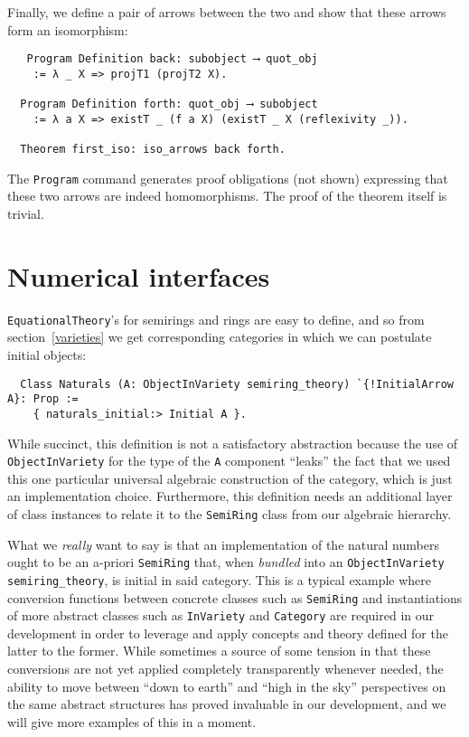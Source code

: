 \documentclass[a4paper,10pt,runningheads]{llncs}
\begin{document}
Finally, we define a pair of arrows between the two and show that these arrows form an isomorphism:
\begin{lstlisting}
   Program Definition back: subobject ⟶ quot_obj
    := λ _ X => projT1 (projT2 X).

  Program Definition forth: quot_obj ⟶ subobject
    := λ a X => existT _ (f a X) (existT _ X (reflexivity _)).

  Theorem first_iso: iso_arrows back forth.
\end{lstlisting}
The \lstinline|Program| command generates proof obligations (not shown) expressing that these two arrows are indeed homomorphisms. The proof of the theorem itself is trivial.


\section{Numerical interfaces}

\lstinline|EquationalTheory|'s for semirings and rings are easy to define, and so from section~\ref{varieties} we get corresponding categories in which we can postulate initial objects:
\begin{lstlisting}
  Class Naturals (A: ObjectInVariety semiring_theory) `{!InitialArrow A}: Prop :=
    { naturals_initial:> Initial A }.
\end{lstlisting}
While succinct, this definition is not a satisfactory abstraction because the use of \lstinline|ObjectInVariety| for the type of the \lstinline|A| component ``leaks'' the fact that we used this one particular universal algebraic construction of the category, which is just an implementation choice. Furthermore, this definition needs an additional layer of class instances to relate it to the \lstinline|SemiRing| class from our algebraic hierarchy.

What we \emph{really} want to say is that an implementation of the natural numbers ought to be an a-priori \lstinline|SemiRing| that, when \emph{bundled} into an \lstinline|ObjectInVariety semiring_theory|, is initial in said category. This is a typical example where conversion functions between concrete classes such as \lstinline|SemiRing| and instantiations of more abstract classes such as \lstinline|InVariety| and \lstinline|Category| are required in our development in order to leverage and apply concepts and theory defined for the latter to the former. While sometimes a source of some tension in that these conversions are not yet applied completely transparently whenever needed, the ability to move between ``down to earth'' and ``high in the sky'' perspectives on the same abstract structures has proved invaluable in our development, and we will give more examples of this in a moment.
\end{document}
